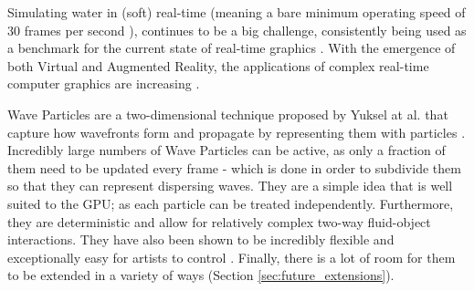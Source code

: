 \documentclass[12pt,a4paper,twoside]{report}
\begin{document}
Simulating water in (soft) real-time (meaning a bare minimum operating speed of 30
frames per second \cite{gameenginebook}), continues to be a
big challenge, consistently being used as a benchmark for the current state of
real-time graphics \cite{gamingmobydick}. With the emergence of both Virtual and
Augmented Reality, the applications of complex real-time computer graphics are
increasing \cite{ARApplications} \cite{VRGrowth}.




Wave Particles are a two-dimensional technique proposed by Yuksel at al. that
capture how wavefronts form and propagate by representing them with particles
\cite{Yuksel2007}. Incredibly large numbers of Wave Particles can be active, as
only a fraction of them need to be updated every frame - which is done in order
to subdivide them so that they can represent dispersing waves. They are a
simple idea that is well suited to the GPU; as each particle can be treated
independently. Furthermore, they are deterministic and allow for relatively
complex two-way fluid-object interactions. They have also been shown to be
incredibly flexible and exceptionally easy for artists to control
\cite{Tatarchuk:2016:ARR:2897826.2940291}. Finally, there is a lot of room for
them to be extended in a variety of ways (Section \ref{sec:future_extensions}).
\end{document}
